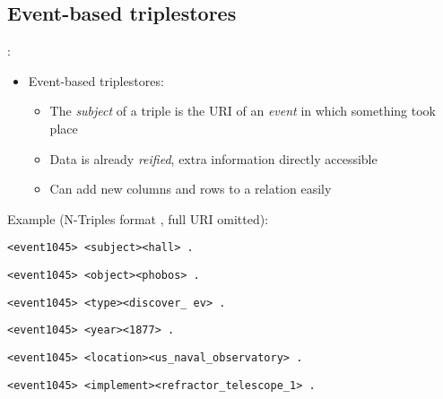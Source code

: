 \documentclass[logoontitle,tabu,supertabular,aspectratio=43]{preney-uwindsor-beamer}
\begin{document}

    \subsection{Event-based triplestores}
    \begin{frame}{\insertsection: \insertsubsection}
        \begin{itemize}
            \item Event-based triplestores:
            \begin{itemize}
                \item The {\em subject} of a triple is the URI of an \textit{event} in which something took place
                \item Data is already {\em reified}, extra information directly accessible
                \item Can add new columns and rows to a relation easily
            \end{itemize}
        \end{itemize}

        Example (N-Triples format \cite{w3cntriples}, full URI omitted):
        \begin{block}{}
            \hspace{5em}\texttt{<event1045> <subject>\phantom{qqq}<hall> .}

            \hspace{5em}\texttt{<event1045> <object>\phantom{qqqq}<phobos> .}

            \hspace{5em}\texttt{<event1045> <type>\phantom{qqqqqq}<discover\_ ev> .}

            \hspace{5em}\texttt{<event1045> <year>\phantom{qqqqqq}<1877> .}

            \hspace{5em}\texttt{<event1045> <location>\phantom{qq}<us\_naval\_observatory> .}

            \hspace{5em}\texttt{<event1045> <implement>\phantom{q}<refractor\_telescope\_1> .}
        \end{block}

    \end{frame}




\end{document}
